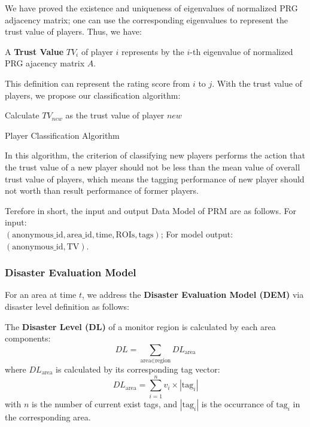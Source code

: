 We have proved the existence and uniqueness of eigenvalues of normalized PRG adjacency matrix; 
one can use the corresponding eigenvalues to represent the trust value of players. Thus, we have:

\begin{definition}
A \textbf{Trust Value} $TV_i$ of player $i$ represents by the $i$-th eigenvalue of normalized PRG ajacency matrix $A$.
\end{definition}

This definition can represent the rating score from $i$ to $j$. With the trust value of players,
we propose our classification algorithm:

\begin{algorithm}[H]
\label{algo:malicious}
\SetAlgoLined
{}
Calculate $TV_{new}$ as the trust value of player $new$ \;
\caption{Player Classification Algorithm}
\end{algorithm}

In this algorithm, the criterion of classifying new players performs the action that 
the trust value of a new player should not be less than the mean value of overall trust value of players, 
which means the tagging performance of new player should not worth than result performance of former players.

Terefore in short, the input and output Data Model of PRM are as follows. For input:\\
$(\text{anonymous\_id}, \text{area\_id}, \text{time}, \text{ROIs}, \text{tags})$; 
For model output: 
$(\text{anonymous\_id}, \text{TV})$.

\subsubsection{Disaster Evaluation Model}
\label{chapter:dem}

For an area at time $t$, we address the \textbf{Disaster Evaluation Model (DEM)} 
via disaster level definition as follows:

\begin{definition}
\label{def:dl}
The \textbf{Disaster Level (DL)} of a monitor region is calculated by each area components:
\[
  DL = \sum_{\text{area}\in\text{region}}{DL_{\text{area}}}
\]
where $DL_{\text{area}}$ is calculated by its corresponding tag vector:
\[
  DL_{\text{area}} = \sum_{i=1}^{n}{v_i \times |\text{tag}_i|}
\]
with $n$ is the number of current exist tags, and $|\text{tag}_i|$ is the occurrance of $\text{tag}_i$
in the corresponding area.
\end{definition}

